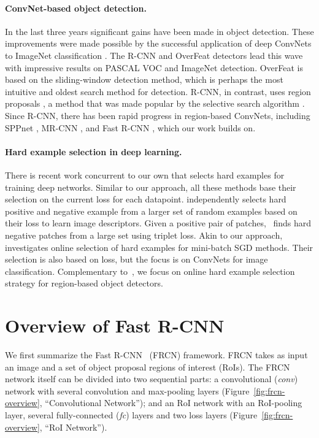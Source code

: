 \documentclass[10pt,twocolumn,letterpaper]{article}
\begin{document}
\vspace{-0.1in}
\paragraph{ConvNet-based object detection.} 
In the last three years significant gains have been made in object detection. These improvements were made possible by the successful application of deep ConvNets \cite{AlexNet} to ImageNet classification \cite{imagenet}. The R-CNN \cite{rcnn} and OverFeat \cite{overfeat} detectors lead this wave with impressive results on PASCAL VOC \cite{voc} and ImageNet detection. OverFeat is based on the sliding-window detection method, which is perhaps the most intuitive and oldest search method for detection. R-CNN, in contrast, uses region proposals \cite{alexe2010objec,objectness,endres2010category,Uijlings13, cpmc,mcg,BingObj2014,ZitnickEdgeBoxes2014,krahenbuhl2014geodesic}, a method that was made popular by the selective search algorithm \cite{Uijlings13}. Since R-CNN, there has been rapid progress in region-based ConvNets, including SPPnet \cite{SPPnet}, MR-CNN \cite{mrcnn}, and Fast R-CNN \cite{frcn}, which our work builds on.

\vspace{-0.1in}
\paragraph{Hard example selection in deep learning.}
There is recent work \cite{simo2014fracking,wang2015unsupervised,loshchilov2015online} concurrent to our own that selects hard examples for training deep networks. Similar to our approach, all these methods base their selection on the current loss for each datapoint. \cite{simo2014fracking} independently selects hard positive and negative example from a larger set of random examples based on their loss to learn image descriptors. Given a positive pair of patches,~\cite{wang2015unsupervised} finds hard negative patches from a large set using triplet loss. Akin to our approach,~\cite{loshchilov2015online} investigates online selection of hard examples for mini-batch SGD methods. Their selection is also based on loss, but the focus is on ConvNets for image classification. Complementary to~\cite{loshchilov2015online}, we focus on online hard example selection strategy for region-based object detectors.



\section{Overview of Fast R-CNN}\label{sec:frcn-overview-sec}
\vspace{-0.05in}
We first summarize the Fast R-CNN~\cite{frcn} (FRCN) framework. FRCN takes as input an image and a set of object proposal regions of interest (RoIs). The FRCN network itself can be divided into two sequential parts: a convolutional (\emph{conv}) network with several convolution and max-pooling layers (Figure~\ref{fig:frcn-overview}, ``Convolutional Network''); and an RoI network with an RoI-pooling layer, several fully-connected (\emph{fc}) layers and two loss layers (Figure~\ref{fig:frcn-overview}, ``RoI Network'').
\end{document}
